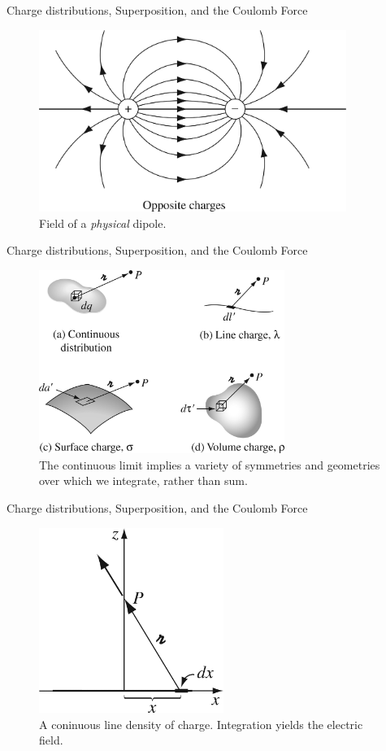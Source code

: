 \documentclass{beamer}
\begin{document}
\begin{frame}{Charge distributions, Superposition, and the Coulomb Force}
\begin{figure}
\centering
\includegraphics[width=10cm]{figures/2_13.jpg}
\caption{\label{fig:2_13} Field of a \textit{physical} dipole.}
\end{figure}
\end{frame}

\begin{frame}{Charge distributions, Superposition, and the Coulomb Force}
\begin{figure}
\centering
\includegraphics[width=8cm]{figures/2_5.jpg}
\caption{\label{fig:2_5} The continuous limit implies a variety of symmetries and geometries over which we integrate, rather than sum.}
\end{figure}
\end{frame}

\begin{frame}{Charge distributions, Superposition, and the Coulomb Force}
\begin{figure}
\centering
\includegraphics[width=6cm]{figures/2_6.jpg}
\caption{\label{fig:2_6} A coninuous line density of charge.  Integration yields the electric field.}
\end{figure}
\end{frame}
\end{document}
